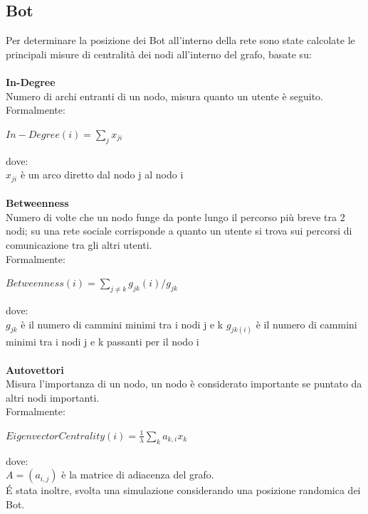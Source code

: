     \subsection{Bot}\label{Bot}
    Per determinare la posizione dei Bot all'interno della rete sono state calcolate le principali misure di centralità dei nodi all'interno del grafo, basate su:
    \\\\
    \textbf{In-Degree}
    \\
    Numero di archi entranti di un nodo, misura quanto un utente è seguito.\\
    Formalmente: \\
    \begin{center}
        $In-Degree(i) = \displaystyle\sum_{j}x_{ji}$
    \end{center}
    dove: \\
    $x_{ji}$ è un arco diretto dal nodo j al nodo i
    \\
    \\
    \textbf{Betweenness}
    \\
    Numero di volte che un nodo funge da ponte lungo il percorso più breve tra 2 nodi; su una rete sociale corrisponde a quanto un utente si trova sui percorsi di comunicazione tra gli altri utenti.\\
    Formalmente: \newline
    \begin{center}
         $Betweenness(i) = \displaystyle\sum_{j \neq k } g_{jk}(i)/g_{jk}$ 
    \end{center}
    dove: \\
    $g_{jk}$ è il numero di cammini minimi tra i nodi j e k \newline 
    $g_{jk(i)}$ è il numero di cammini minimi tra i nodi j e k passanti per il nodo i
   \\
    \\
    \textbf{Autovettori}
    \\
    Misura l'importanza di un nodo, un nodo è considerato importante se puntato da altri nodi importanti. \\
    Formalmente: \\
    \begin{center}
    $EigenvectorCentrality(i) = \frac{1}{\lambda}\displaystyle\sum_{k}a_{k,i}x_{k}$
    \end{center}
    dove: \\
    $A=(a_{i,j})$ è la matrice di adiacenza del grafo.
\\
    É stata inoltre, svolta una simulazione considerando una posizione randomica dei Bot.


